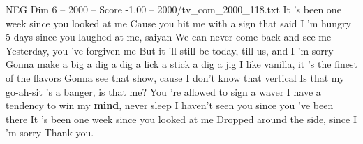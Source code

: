 \begin{textsample}{NEG Dim 6 – 2000 – Score -1.00 – 2000/tv\_com\_2000\_118.txt}  \label{ex:f6_neg_016}
It 's been one week since you looked at me Cause you hit me with a sign that said I 'm hungry 5 days since you laughed at me, saiyan We can never come back and see me Yesterday, you 've forgiven me But it 'll still be today, till us, and I 'm sorry Gonna make a big a dig a dig a lick a stick a dig a jig I like vanilla, it 's the finest of the flavors Gonna see that show, cause I don't know that vertical Is that my go-ah-sit 's a banger, is that me?
You 're allowed to sign a waver I have a tendency to win my \textbf{mind}, never sleep I haven't seen you since you 've been there It 's been one week since you looked at me Dropped around the side, since I 'm sorry Thank you.

\end{textsample}
